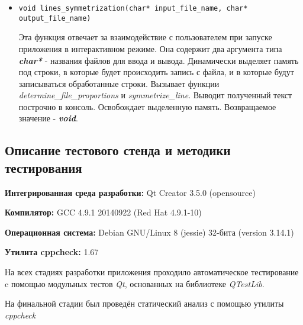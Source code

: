 \documentclass[12pt,a4paper]{report}
\begin{document}
\begin{enumerate}
\begin{itemize}
\item \verb-void lines_symmetrization(char* input_file_name, char* output_file_name)-

Эта функция отвечает за взаимодействие с пользователем при запуске приложения в интерактивном режиме. Она содержит два аргумента типа \textbf{\textit{char*} }- названия файлов для ввода и вывода.  Динамически выделяет память под строки, в которые будет происходить запись с файла, и в которые будут записываться обработанные строки. Вызывает функции \textit{determine\_file\_proportions} и \textit{symmetrize\_line}. Выводит полученный текст построчно в консоль. Освобождает выделенную память. Возвращаемое значение - \textit{\textbf{void}}.
\end{itemize}


\end{enumerate}
\subsection{Описание тестового стенда и методики тестирования}

\begin{flushleft}
\textbf{Интегрированная среда разработки:} Qt Creator 3.5.0 (opensource)

\textbf{Компилятор:} GCC 4.9.1 20140922 (Red Hat 4.9.1-10)

\textbf{Операционная система:} Debian GNU/Linux 8 (jessie) 32-бита (version 3.14.1)

\textbf{Утилита cppcheck:} 1.67
\end{flushleft}

На всех стадиях разработки приложения проходило автоматическое тестирование c помощью модульных тестов \textit{Qt}, основанных на библиотеке  \textit{QTestLib}.

На финальной стадии был проведён статический анализ с помощью утилиты \textit{cppcheck}%
\end{document}
